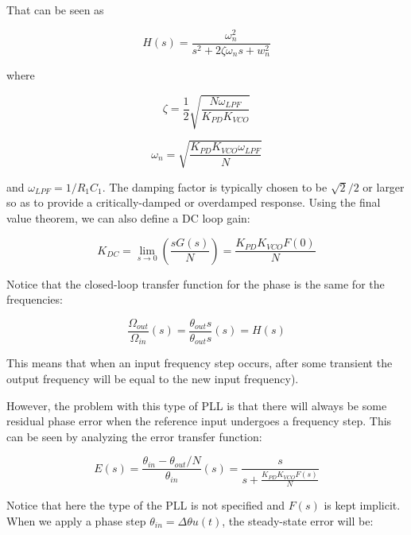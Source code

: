 \documentclass[lettersize,journal]{IEEEtran}
\begin{document}
That can be seen as

\begin{equation}\label{eq:type_one_tf_bis}
    H(s)=\frac{\omega_n^2}{s^2+2\zeta\omega_ns+w_n^2}
\end{equation}

where

\begin{equation}\label{eq:damping_factor}
    \zeta=\frac{1}{2}\sqrt{\frac{N\omega_{LPF}}{K_{PD}K_{VCO}}}
\end{equation}

\begin{equation}\label{eq:resonance_freq}
    \omega_n=\sqrt{\frac{K_{PD}K_{VCO}\omega_{LPF}}{N}}
\end{equation}

and $\omega_{LPF}=1/R_1C_1$. The damping factor is typically chosen to be $\sqrt{2}/2$ or larger so as to provide a critically-damped or overdamped response. Using the final value theorem, we can also define a DC loop gain:

\begin{equation}\label{eq:dc_gain}
    K_{DC}=\underset{s\to 0}{\lim}\left(\frac{sG(s)}{N}\right)=\frac{K_{PD}K_{VCO}F(0)}{N}
\end{equation}

Notice that the closed-loop transfer function for the phase is the same for the frequencies:

\begin{equation}\label{eq:same_tf}
    \frac{\Omega_{out}}{\Omega_{in}}(s)=\frac{\theta_{out}s}{\theta_{out}s}(s)=H(s)
\end{equation}

This means that when an input frequency step occurs, after some transient the output frequency will be equal to the new input frequency).

However, the problem with this type of PLL is that there will always be some residual phase error when the reference input undergoes a frequency step. This can be seen by analyzing the error transfer function:

\begin{equation}\label{eq:error_tf}
    E(s)=\frac{\theta_{in}-\theta_{out}/N}{\theta_{in}}(s)=\frac{s}{s+\frac{K_{PD}K_{VCO}F(s)}{N}}
\end{equation}

Notice that here the type of the PLL is not specified and $F(s)$ is kept implicit.
When we apply a phase step $\theta_{in}=\Delta\theta u(t)$, the steady-state error will be:
\end{document}
